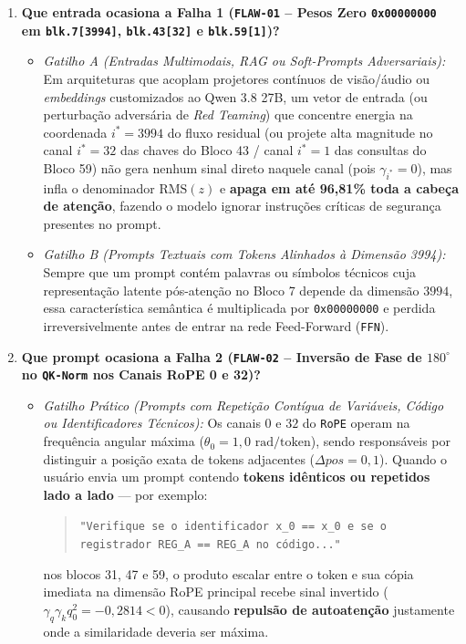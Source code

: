 \documentclass[11pt,a4paper]{article}
\theoremstyle{definition}
\begin{document}
\begin{enumerate}
    \item \textbf{Que entrada ocasiona a Falha 1 (\texttt{FLAW-01} -- Pesos Zero \texttt{0x00000000} em \texttt{blk.7[3994]}, \texttt{blk.43[32]} e \texttt{blk.59[1]})?}
    \begin{itemize}
        \item \textit{Gatilho A (Entradas Multimodais, RAG ou Soft-Prompts Adversariais):} Em arquiteturas que acoplam projetores contínuos de visão/áudio ou \textit{embeddings} customizados ao Qwen 3.8 27B, um vetor de entrada (ou perturbação adversária de \textit{Red Teaming}) que concentre energia na coordenada $i^* = 3994$ do fluxo residual (ou projete alta magnitude no canal $i^* = 32$ das chaves do Bloco 43 / canal $i^* = 1$ das consultas do Bloco 59) não gera nenhum sinal direto naquele canal (pois $\gamma_{i^*} = 0$), mas infla o denominador $\text{RMS}(z)$ e \textbf{apaga em até 96,81\% toda a cabeça de atenção}, fazendo o modelo ignorar instruções críticas de segurança presentes no prompt.
        \item \textit{Gatilho B (Prompts Textuais com Tokens Alinhados à Dimensão 3994):} Sempre que um prompt contém palavras ou símbolos técnicos cuja representação latente pós-atenção no Bloco 7 depende da dimensão $3994$, essa característica semântica é multiplicada por \texttt{0x00000000} e perdida irreversivelmente antes de entrar na rede Feed-Forward (\texttt{FFN}).
    \end{itemize}

    \item \textbf{Que prompt ocasiona a Falha 2 (\texttt{FLAW-02} -- Inversão de Fase de $180^\circ$ no \texttt{QK-Norm} nos Canais RoPE 0 e 32)?}
    \begin{itemize}
        \item \textit{Gatilho Prático (Prompts com Repetição Contígua de Variáveis, Código ou Identificadores Técnicos):} Os canais $0$ e $32$ do \texttt{RoPE} operam na frequência angular máxima ($\theta_0 = 1{,}0\text{ rad/token}$), sendo responsáveis por distinguir a posição exata de tokens adjacentes ($\Delta pos = 0, 1$). Quando o usuário envia um prompt contendo \textbf{tokens idênticos ou repetidos lado a lado} --- por exemplo:
        \begin{quote}
        \texttt{"Verifique se o identificador x\_0 == x\_0 e se o registrador REG\_A == REG\_A no código..."}
        \end{quote}
        nos blocos 31, 47 e 59, o produto escalar entre o token e sua cópia imediata na dimensão RoPE principal recebe sinal invertido ($\gamma_q \gamma_k q_0^2 = -0{,}2814 < 0$), causando \textbf{repulsão de autoatenção} justamente onde a similaridade deveria ser máxima.
    \end{itemize}


\end{enumerate}
\end{document}
